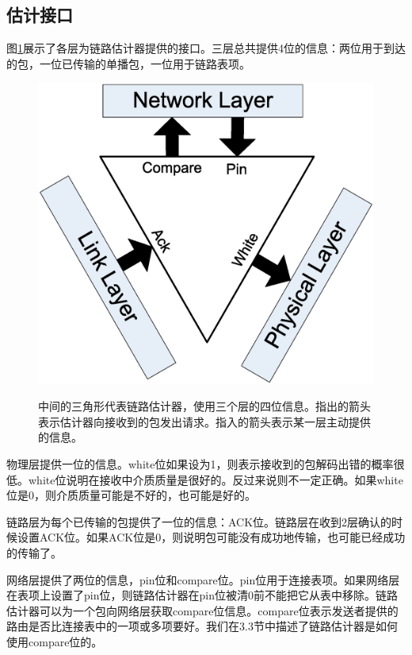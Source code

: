 \documentclass[12pt,a4paper]{article}
\begin{document}
\subsection{估计接口}

图\ref{fig4}展示了各层为链路估计器提供的接口。三层总共提供4位的信息：两位用于到达的包，一位已传输的单播包，一位用于链路表项。

\begin{figure}[ht]
\centering
\includegraphics[scale=0.3]{figures/fig4}\label{fig4}
\caption{中间的三角形代表链路估计器，使用三个层的四位信息。指出的箭头表示估计器向接收到的包发出请求。指入的箭头表示某一层主动提供的信息。}
\end{figure}

物理层提供一位的信息。white位如果设为1，则表示接收到的包解码出错的概率很低。white位说明在接收中介质质量是很好的。反过来说则不一定正确。如果white位是0，则介质质量可能是不好的，也可能是好的。

链路层为每个已传输的包提供了一位的信息：ACK位。链路层在收到2层确认的时候设置ACK位。如果ACK位是0，则说明包可能没有成功地传输，也可能已经成功的传输了。

网络层提供了两位的信息，pin位和compare位。pin位用于连接表项。如果网络层在表项上设置了pin位，则链路估计器在pin位被清0前不能把它从表中移除。链路估计器可以为一个包向网络层获取compare位信息。compare位表示发送者提供的路由是否比连接表中的一项或多项要好。我们在3.3节中描述了链路估计器是如何使用compare位的。
\end{document}
